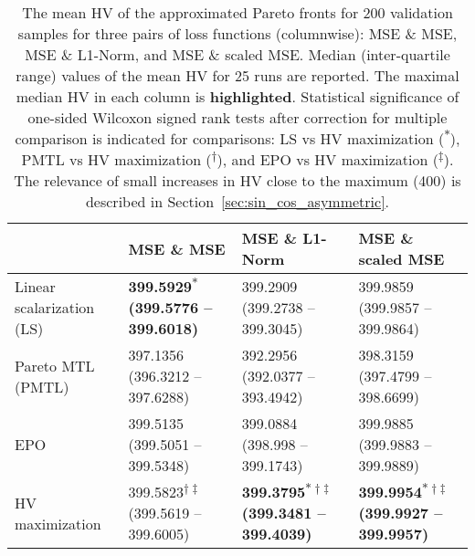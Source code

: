 \begin{table}[]
\renewcommand{\arraystretch}{1.5}
\caption{\small The mean HV of the approximated Pareto fronts for 200 validation samples for three pairs of loss functions (columnwise): MSE \& MSE, MSE \& L1-Norm, and MSE \& scaled MSE. Median (inter-quartile range) values of the mean HV for 25 runs are reported. The maximal median HV in each column is \textbf{highlighted}. Statistical significance of one-sided Wilcoxon signed rank tests after correction for multiple comparison is indicated for comparisons: LS vs HV maximization (\textsuperscript{$\ast$}), PMTL vs HV maximization (\textsuperscript{$\dagger$}), and EPO vs HV maximization (\textsuperscript{$\ddagger$}). The relevance of small increases in HV close to the maximum (400) is described in Section~\ref{sec:sin_cos_asymmetric}.
}
\label{tab:HV_sin_cos}
\begin{tabular}{m{2cm}m{3.8cm}m{3.8cm}m{3.8cm}}
\toprule
\textbf{} & \textbf{MSE \& MSE} & \textbf{MSE \& L1-Norm} & \textbf{MSE \& scaled MSE}\\
\midrule
\small Linear scalarization (LS) & \footnotesize \textbf{399.5929\textsuperscript{$\ast$} \newline(399.5776 -- 399.6018)}  & \footnotesize 399.2909 \newline(399.2738 -- 399.3045)  & \footnotesize 399.9859 \newline(399.9857 -- 399.9864)\\ 

\small Pareto MTL (PMTL) & \footnotesize 397.1356 \newline(396.3212 -- 397.6288)  & \footnotesize 392.2956 \newline(392.0377 -- 393.4942)  & \footnotesize 398.3159 \newline(397.4799 -- 398.6699)\\ 

\small EPO & \footnotesize 399.5135 \newline(399.5051 -- 399.5348) & \footnotesize 399.0884 \newline(398.998 -- 399.1743)  & \footnotesize 399.9885 \newline(399.9883 -- 399.9889)\\ 

\small HV maximization & \footnotesize 399.5823\textsuperscript{$\dagger \ddagger$} \newline(399.5619 -- 399.6005) & \footnotesize \textbf{399.3795\textsuperscript{$\ast \dagger \ddagger$} \newline(399.3481 -- 399.4039)}  & \footnotesize \textbf{399.9954\textsuperscript{$\ast \dagger \ddagger$} \newline(399.9927 -- 399.9957)}\\ 
\bottomrule
\end{tabular}
\end{table}

